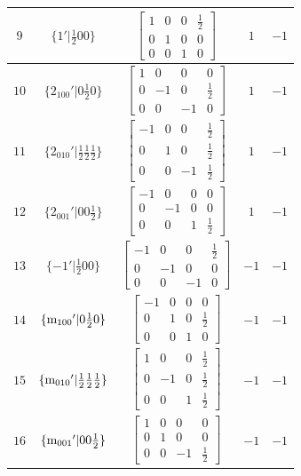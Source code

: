 \documentclass[fleqn,8pt]{jsarticle}
\begin{document}
\begin{longtable}{ccccc}
$ 9 $ & $ \{1{}'|\frac{1}{2} 0 0\} $ & $ \begin{bmatrix} 1 & 0 & 0 & \frac{1}{2} \\ 0 & 1 & 0 & 0 \\ 0 & 0 & 1 & 0 \end{bmatrix} $ & $ 1 $ & $ -1 $ \\ \hline
$ 10 $ & $ \{2{}_{100}{}'|0 \frac{1}{2} 0\} $ & $ \begin{bmatrix} 1 & 0 & 0 & 0 \\ 0 & -1 & 0 & \frac{1}{2} \\ 0 & 0 & -1 & 0 \end{bmatrix} $ & $ 1 $ & $ -1 $ \\ \hline
$ 11 $ & $ \{2{}_{010}{}'|\frac{1}{2} \frac{1}{2} \frac{1}{2}\} $ & $ \begin{bmatrix} -1 & 0 & 0 & \frac{1}{2} \\ 0 & 1 & 0 & \frac{1}{2} \\ 0 & 0 & -1 & \frac{1}{2} \end{bmatrix} $ & $ 1 $ & $ -1 $ \\ \hline
$ 12 $ & $ \{2{}_{001}{}'|0 0 \frac{1}{2}\} $ & $ \begin{bmatrix} -1 & 0 & 0 & 0 \\ 0 & -1 & 0 & 0 \\ 0 & 0 & 1 & \frac{1}{2} \end{bmatrix} $ & $ 1 $ & $ -1 $ \\ \hline
$ 13 $ & $ \{-1{}'|\frac{1}{2} 0 0\} $ & $ \begin{bmatrix} -1 & 0 & 0 & \frac{1}{2} \\ 0 & -1 & 0 & 0 \\ 0 & 0 & -1 & 0 \end{bmatrix} $ & $ -1 $ & $ -1 $ \\ \hline
$ 14 $ & $ \{{\rm m}_{100}{}'|0 \frac{1}{2} 0\} $ & $ \begin{bmatrix} -1 & 0 & 0 & 0 \\ 0 & 1 & 0 & \frac{1}{2} \\ 0 & 0 & 1 & 0 \end{bmatrix} $ & $ -1 $ & $ -1 $ \\ \hline
$ 15 $ & $ \{{\rm m}_{010}{}'|\frac{1}{2} \frac{1}{2} \frac{1}{2}\} $ & $ \begin{bmatrix} 1 & 0 & 0 & \frac{1}{2} \\ 0 & -1 & 0 & \frac{1}{2} \\ 0 & 0 & 1 & \frac{1}{2} \end{bmatrix} $ & $ -1 $ & $ -1 $ \\ \hline
$ 16 $ & $ \{{\rm m}_{001}{}'|0 0 \frac{1}{2}\} $ & $ \begin{bmatrix} 1 & 0 & 0 & 0 \\ 0 & 1 & 0 & 0 \\ 0 & 0 & -1 & \frac{1}{2} \end{bmatrix} $ & $ -1 $ & $ -1 $ \\
\end{longtable}
\end{document}
